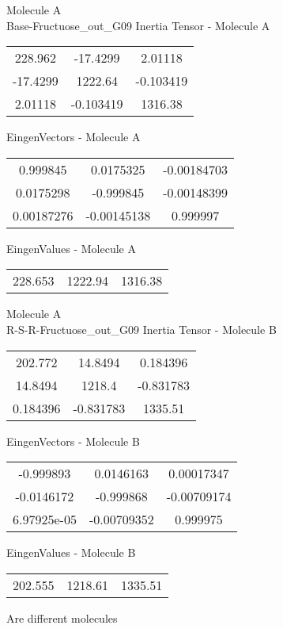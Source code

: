 \newpage
\begin{multicols}{2}
\begin{center}
Molecule A \\ 
Base-Fructuose_out_G09
Inertia Tensor - Molecule A \\
\vtab
\begin{tabular}{|c c c|}
228.962	 & 	-17.4299	 & 	2.01118	 \\
-17.4299	 & 	1222.64	 & 	-0.103419	 \\
2.01118	 & 	-0.103419	 & 	1316.38
\end{tabular}

\vtab
 EingenVectors - Molecule A     \\
\vtab
\begin{tabular}{|c c c|}
0.999845	 & 	0.0175325	 & 	-0.00184703	 \\
0.0175298	 & 	-0.999845	 & 	-0.00148399	 \\
0.00187276	 & 	-0.00145138	 & 	0.999997
\end{tabular}

\vtab
 EingenValues - Molecule A     \\
\vtab
\begin{tabular}{|c c c|}
228.653	 & 	1222.94	 & 	1316.38
\end{tabular}
\columnbreak
Molecule A \\ 
R-S-R-Fructuose_out_G09
Inertia Tensor - Molecule B \\
\vtab
\begin{tabular}{|c c c|}
202.772	 & 	14.8494	 & 	0.184396	 \\
14.8494	 & 	1218.4	 & 	-0.831783	 \\
0.184396	 & 	-0.831783	 & 	1335.51
\end{tabular}

\vtab
 EingenVectors - Molecule B     \\
\vtab
\begin{tabular}{|c c c|}
-0.999893	 & 	0.0146163	 & 	0.00017347	 \\
-0.0146172	 & 	-0.999868	 & 	-0.00709174	 \\
6.97925e-05	 & 	-0.00709352	 & 	0.999975
\end{tabular}

\vtab
 EingenValues - Molecule B     \\
\vtab
\begin{tabular}{|c c c|}
202.555	 & 	1218.61	 & 	1335.51
\end{tabular}
\textcolor{NavyBlue}{\large Are different molecules}
\end{center}
\end{multicols}
